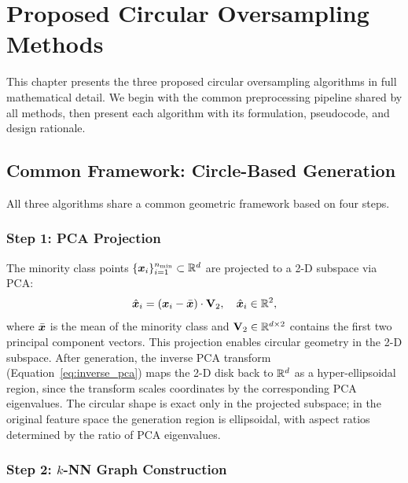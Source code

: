 
\chapter{Proposed Circular Oversampling Methods}
\label{ch:proposed_methods}

This chapter presents the three proposed circular oversampling algorithms in full mathematical detail.
We begin with the common preprocessing pipeline shared by all methods, then present each algorithm with its formulation, pseudocode, and design rationale.


\section{Common Framework: Circle-Based Generation}
\label{sec:methods:framework}

All three algorithms share a common geometric framework based on four steps.

\subsection{Step 1: PCA Projection}

The minority class points $\{\bm{x}_i\}_{i=1}^{n_{\min}} \subset \mathbb{R}^d$ are projected to a 2-D subspace via PCA:
\begin{equation}
    \hat{\bm{x}}_i = (\bm{x}_i - \bar{\bm{x}}) \cdot \mathbf{V}_2, \quad \hat{\bm{x}}_i \in \mathbb{R}^2,
    \label{eq:pca_proj}
\end{equation}
where $\bar{\bm{x}}$ is the mean of the minority class and $\mathbf{V}_2 \in \mathbb{R}^{d \times 2}$ contains the first two principal component vectors.
This projection enables circular geometry in the 2-D subspace.
After generation, the inverse PCA transform (Equation~\eqref{eq:inverse_pca}) maps the 2-D disk back to $\mathbb{R}^d$ as a hyper-ellipsoidal region, since the transform scales coordinates by the corresponding PCA eigenvalues.
The circular shape is exact only in the projected subspace; in the original feature space the generation region is ellipsoidal, with aspect ratios determined by the ratio of PCA eigenvalues.

\subsection{Step 2: $k$-NN Graph Construction}


